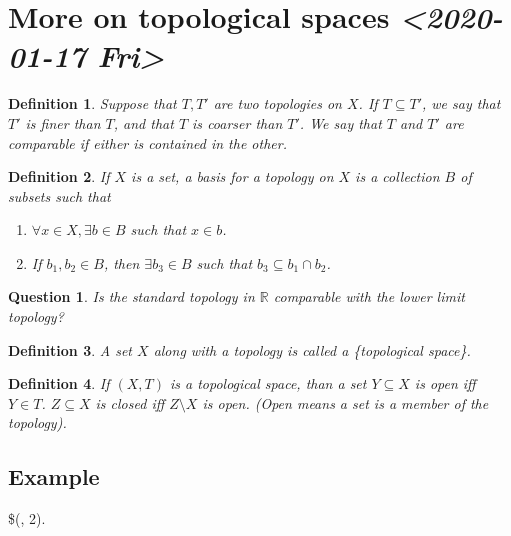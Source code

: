 \documentclass[11pt]{article}
\newtheorem{definition}{Definition}[section]
\newtheorem{question}{Question}[section]
\begin{document}
\section{More on topological spaces \textit{<2020-01-17 Fri>}}
\label{sec:org21ef3e9}
\begin{definition}


Suppose that \(T, T'\) are two topologies on \(X\). If \(T \subseteq T'\),
we say that \(T'\) is \textit{finer} than \(T\), and that \(T\) is
\textit{coarser} than \(T'\). We say that \(T\) and \(T'\) are comparable if
either is contained in the other. 
\end{definition}

\begin{definition}


If \(X\) is a set, a \textit{basis} for a topology on \(X\) is a
collection \(B\) of subsets such that 
\begin{enumerate}
\item \(\forall x \in X, \exists b \in B\) such that \(x \in b\).
\item If \(b_1, b_2 \in B\), then \(\exists b_3 \in B\) such that \(b_3
   \subseteq b_1\cap b_2\).
\end{enumerate}
\end{definition}

\begin{question}


Is the standard topology in \(\mathbb{R}\) comparable with the lower
limit topology?
\end{question}

\begin{definition}


A set \(X\) along with a topology is called a \textit\{topological
space\}.
\end{definition}

\begin{definition}


If \((X,T)\) is a topological space, than a set \(Y\subseteq X\) is open
iff \(Y \in T\). \(Z\subseteq X\) is closed iff \(Z\setminus X\) is
open. (Open means a set is a member of the topology). 
\end{definition}

\subsection{Example}
\label{sec:org9cbfb6e}
\$(, 2\textsuperscript{}). 
\end{document}
